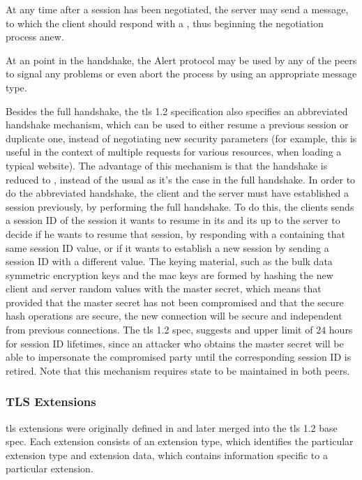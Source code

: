\documentclass{llncs}
\begin{document}
At any time after a session has been negotiated, the server may send a 
message, to which the client should respond with a , thus
beginning the negotiation process anew.

At an point in the handshake, the Alert protocol may be used by any of the peers
to signal any problems or even abort the process by using an appropriate message type.

Besides the full handshake, the \gls{tls} 1.2 specification also specifies an
abbreviated handshake mechanism, which can be used to either resume a previous session
or duplicate one, instead of negotiating new security parameters (for example, this is useful
in the context of multiple  requests for various resources, when loading
a typical website). The advantage of this mechanism is that the handshake is reduced
to , instead of the usual  as it's the case in
the full handshake. In order to do the abbreviated handshake,
the client and the server must have established a session previously, by performing
the full handshake. To do this, the clients sends a session ID of the session it wants to
resume in its  and its up to the server to decide if he
wants to resume that session, by responding with a  containing
that same session ID value, or if it wants to establish a new session by
sending a session ID with a different value. The keying material, such as the bulk
data symmetric encryption keys and the \gls{mac} keys are formed by hashing the new client
and server random values with the master secret, which means
that provided that the master secret has not been compromised and that the secure
hash operations are secure, the new connection will be secure and independent
from previous connections. The \gls{tls} 1.2 spec, suggests and upper limit
of $24$ hours for session ID lifetimes, since an attacker who obtains the master secret
will be able to impersonate the compromised party until the corresponding session
ID is retired. Note that this mechanism requires state to be maintained in both peers.

\subsubsection{TLS Extensions}

\gls{tls} extensions were originally defined in \cite{RFC4366}
and later merged into the \gls{tls} 1.2 base spec. Each extension consists of an
extension type, which identifies the particular extension type and extension data,
which contains information specific to a particular extension.
\end{document}
